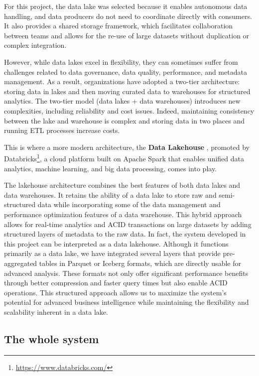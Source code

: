 For this project, the data lake was selected because it enables autonomous data handling, and data producers do not need to coordinate directly with consumers. It also provides a shared storage framework, which facilitates collaboration between teams and allows for the re-use of large datasets without duplication or complex integration.

However, while data lakes excel in flexibility, they can sometimes suffer from challenges related to data governance, data quality, performance, and metadata management. As a result, organizations have adopted a two-tier architecture: storing data in lakes and then moving curated data to warehouses for structured analytics.
The two-tier model (data lakes + data warehouses) introduces new complexities, including reliability and cost issues. Indeed, maintaining consistency between the lake and warehouse is complex and storing data in two places and running \ac{ETL} processes increase costs.

This is where a more modern architecture, the \textbf{Data Lakehouse} \cite{armbrust2021lakehouse}, promoted by Databricks\footnote{\url{https://www.databricks.com/}}, a cloud platform built on Apache Spark that enables unified data analytics, machine learning, and big data processing, comes into play.

The lakehouse architecture combines the best features of both data lakes and data warehouses. It retains the ability of a data lake to store raw and semi-structured data while incorporating some of the data management and performance optimization features of a data warehouse. This hybrid approach allows for real-time analytics and \ac{ACID} transactions on large datasets by adding structured layers of metadata to the raw data.
In fact, the system developed in this project can be interpreted as a data lakehouse. Although it functions primarily as a data lake, we have integrated several layers that provide pre-aggregated tables in Parquet or Iceberg formats, which are directly usable for advanced analysis. These formats not only offer significant performance benefits through better compression and faster query times but also enable \ac{ACID} operations. This structured approach allows us to maximize the system's potential for advanced business intelligence while maintaining the flexibility and scalability inherent in a data lake.

\subsection{The whole system}
\label{sec:wholesystem}

